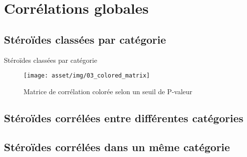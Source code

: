 
\chapter{Corrélations globales}
\clearpage

\section{Stéroïdes classées par catégorie}

	\begin{table}[H]
		\centering
		
		\caption{Stéroïdes classées par catégorie}
		\label{tab:steroidsByCategory}
	\end{table}

    \begin{figure}[H]
        \centering
        \texttt{[image: asset/img/03\_colored\_matrix]}    
        \caption{Matrice de corrélation colorée selon un seuil de P-valeur}
        \label{fig:colored_matrix}
    \end{figure}


\begin{landscape}

\section{Stéroïdes corrélées entre différentes catégories}

	
	\clearpage

\section{Stéroïdes corrélées dans un même catégorie}

	


\end{landscape}

